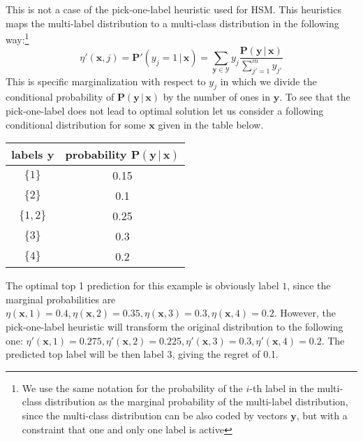 \documentclass{article}
\renewcommand{\vec}[1]{\boldsymbol{#1}}
\newcommand{\bx}{\vec{x}}
\newcommand{\by}{\vec{y}}
\newcommand{\calY}{\mathcal{Y}}
\newcommand{\prob}{\mathbf{P}}
\newcommand{\given}{\, | \,}
\begin{document}
This is not a case of the pick-one-label heuristic used for HSM. This heuristics maps the multi-label distribution to a multi-class distribution in the following way:\footnote{We use the same notation for the probability of the $i$-th label in the multi-class distribution as the marginal probability of the multi-label distribution, since the multi-class distribution can be also coded by vectors $\by$, but with a constraint that one and only one label is active}
$$
\eta'(\bx, j) = \prob'(y_j = 1 \given \bx) = \sum_{\by \in \calY} y_j \frac{\prob(\by \given \bx)}{\sum_{j'=1}^m y_{j'}}
$$
This is specific marginalization with respect to $y_j$ in which we divide the conditional probability of  $\prob(\by \given \bx)$ by the number of ones in $\by$. To see that the pick-one-label does not lead to optimal solution let us consider a following conditional distribution for some $\bx$ given in the table below.
\begin{center}
\begin{tabular}{c c}
\toprule
labels $\by$ & probability $\prob(\by \given \bx)$ \\
\midrule
$\{1\}$ & 0.15 \\
$\{2\}$ & 0.1 \\
$\{1, 2\}$ & 0.25 \\
$\{3\}$ & 0.3 \\
$\{4\}$ & 0.2 \\
\bottomrule
\end{tabular}
\end{center}
The optimal top 1 prediction for this example is obviously label $1$, since the marginal probabilities are $\eta(\bx,1) = 0.4, \eta(\bx,2) = 0.35,  \eta(\bx,3) = 0.3, \eta(\bx,4) =0.2$. However, the pick-one-label heuristic will transform the original distribution to the following one: $\eta'(\bx,1) = 0.275, \eta'(\bx,2) = 0.225,  \eta'(\bx,3) = 0.3, \eta'(\bx,4) =0.2$. The predicted top label will be then label $3$, giving the regret of 0.1. 

\end{document}
